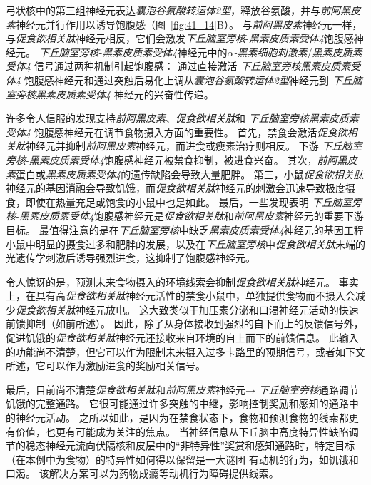 弓状核中的第三组神经元表达\textit{囊泡谷氨酸转运体2型}，释放谷氨酸，并与\textit{前阿黑皮素}神经元并行作用以诱导饱腹感（图~\ref{fig:41_14}B）。
与\textit{前阿黑皮素}神经元一样，与\textit{促食欲相关肽}神经元相反，它们会激发\textit{下丘脑室旁核}-\textit{黑素皮质素受体4}饱腹感神经元。
\textit{下丘脑室旁核}-\textit{黑素皮质素受体4}神经元中的\textit{$\alpha$-黑素细胞刺激素}/\textit{黑素皮质素受体4} 信号通过两种机制引起饱腹感：
通过直接激活 \textit{下丘脑室旁核}\textit{黑素皮质素受体4} 饱腹感神经元和通过突触后易化上调从\textit{囊泡谷氨酸转运体2型}神经元到 \textit{下丘脑室旁核}\textit{黑素皮质素受体4} 神经元的兴奋性传递。


许多令人信服的发现支持\textit{前阿黑皮素}、\textit{促食欲相关肽}和 \textit{下丘脑室旁核}\textit{黑素皮质素受体4} 饱腹感神经元在调节食物摄入方面的重要性。
首先，禁食会激活\textit{促食欲相关肽}神经元并抑制\textit{前阿黑皮素}神经元，而进食或瘦素治疗则相反。
下游 \textit{下丘脑室旁核}-\textit{黑素皮质素受体4}饱腹感神经元被禁食抑制，被进食兴奋。
其次，\textit{前阿黑皮素}蛋白或\textit{黑素皮质素受体4}的遗传缺陷会导致大量肥胖。
第三，小鼠\textit{促食欲相关肽}神经元的基因消融会导致饥饿，而\textit{促食欲相关肽}神经元的刺激会迅速导致极度摄食，即使在热量充足或饱食的小鼠中也是如此。
最后，一些发现表明 \textit{下丘脑室旁核}-\textit{黑素皮质素受体4}饱腹感神经元是\textit{促食欲相关肽}和\textit{前阿黑皮素}神经元的重要下游目标。
最值得注意的是在\textit{下丘脑室旁核}中缺乏\textit{黑素皮质素受体4}神经元的基因工程小鼠中明显的摄食过多和肥胖的发展，以及在\textit{下丘脑室旁核}中\textit{促食欲相关肽}末端的光遗传学刺激后诱导强烈进食，这抑制了饱腹感神经元。


令人惊讶的是，预测未来食物摄入的环境线索会抑制\textit{促食欲相关肽}神经元。
事实上，在具有高\textit{促食欲相关肽}神经元活性的禁食小鼠中，单独提供食物而不摄入会减少\textit{促食欲相关肽}神经元放电。
这大致类似于加压素分泌和口渴神经元活动的快速前馈抑制（如前所述）。
因此，除了从身体接收到强烈的自下而上的反馈信号外，促进饥饿的\textit{促食欲相关肽}神经元还接收来自环境的自上而下的前馈信息。
此输入的功能尚不清楚，但它可以作为限制未来摄入过多卡路里的预期信号，或者如下文所述，它可以作为激励进食的奖励相关信号。


最后，目前尚不清楚\textit{促食欲相关肽}和\textit{前阿黑皮素}神经元→ \textit{下丘脑室旁核}通路调节饥饿的完整通路。
它很可能通过许多突触的中继，影响控制奖励和感知的通路中的神经元活动。
之所以如此，是因为在禁食状态下，食物和预测食物的线索都更有价值，也更有可能成为关注的焦点。
当神经信息从下丘脑中高度特异性缺陷调节的稳态神经元流向伏隔核和皮层中的“非特异性”奖赏和感知通路时，特定目标（在本例中为食物）的特异性如何得以保留是一大谜团 有动机的行为，如饥饿和口渴。
该解决方案可以为药物成瘾等动机行为障碍提供线索。


